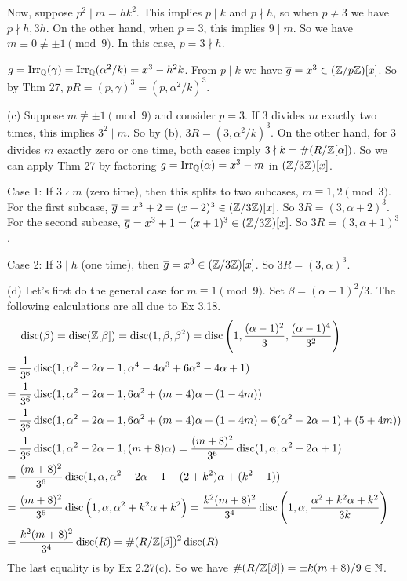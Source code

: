 \documentclass[../Marcus.tex]{subfiles}
\begin{document}
Now, suppose $p^2\mid m=hk^2$. This implies $p\mid k$ and $p\nmid h$, so when $p\neq 3$ we have $p\nmid h,3h$. On the other hand, when $p=3$, this implies $9\mid m$. So we have $m\equiv 0\not\equiv \pm 1\pmod{9}$. In this case, $p=3\nmid h$.

$g=\operatorname{Irr}_{\mathbb{Q}}(\gamma)=\operatorname{Irr}_{\mathbb{Q}}(\alpha^2/k)=x^3-h^2k$. From $p\mid k$ we have $\overline{g}=x^3\in(\mathbb{Z}/p\mathbb{Z})[x]$. So by Thm 27, $pR=(p,\gamma)^3=(p,\alpha^2/k)^3$.

(c) Suppose $m\not\equiv \pm1\pmod{9}$ and consider $p=3$. If $3$ divides $m$ exactly two times, this implies $3^2\mid m$. So by (b), $3R=(3,\alpha^2/k)^3$. On the other hand, for $3$ divides $m$ exactly zero or one time, both cases imply $3\nmid k=\#(R/\mathbb{Z}[\alpha])$. So we can apply Thm 27 by factoring $g=\operatorname{Irr}_{\mathbb{Q}}(\alpha)=x^3-m$ in $(\mathbb{Z}/3\mathbb{Z})[x]$.

Case 1: If $3\nmid m$ (zero time), then this splits to two subcases, $m\equiv 1,2\pmod{3}$. For the first subcase, $\overline{g}=x^3+2=(x+2)^3\in(\mathbb{Z}/3\mathbb{Z})[x]$. So $3R=(3,\alpha+2)^3$. For the second subcase, $\overline{g}=x^3+1=(x+1)^3\in(\mathbb{Z}/3\mathbb{Z})[x]$. So $3R=(3,\alpha+1)^3$.

Case 2: If $3\mid h$ (one time), then $\overline{g}=x^3\in(\mathbb{Z}/3\mathbb{Z})[x]$. So $3R=(3,\alpha)^3$.

(d) Let's first do the general case for $m\equiv 1 \pmod{9}$. Set $\beta=(\alpha-1)^2/3$. The following calculations are all due to Ex 3.18.
\begin{align*}
&\operatorname{disc}(\beta) = \operatorname{disc}(\mathbb{Z}[\beta]) = \operatorname{disc}(1,\beta,\beta^2) = \operatorname{disc}\left(1,\frac{(\alpha-1)^2}{3},\frac{(\alpha-1)^4}{3^2}\right) \\ ={} &\frac{1}{3^6}\operatorname{disc}(1,\alpha^2-2\alpha+1,\alpha^4-4\alpha^3+6\alpha^2-4\alpha+1) \\ ={} &\frac{1}{3^6}\operatorname{disc}(1,\alpha^2-2\alpha+1,6\alpha^2+(m-4)\alpha+(1-4m)) \\ ={} &\frac{1}{3^6}\operatorname{disc}(1,\alpha^2-2\alpha+1,6\alpha^2+(m-4)\alpha+(1-4m)-6(\alpha^2-2\alpha+1)+(5+4m)) \\ ={} &\frac{1}{3^6}\operatorname{disc}(1,\alpha^2-2\alpha+1,(m+8)\alpha) = \frac{(m+8)^2}{3^6}\operatorname{disc}(1,\alpha,\alpha^2-2\alpha+1) \\ ={} &\frac{(m+8)^2}{3^6}\operatorname{disc}(1,\alpha,\alpha^2-2\alpha+1+(2+k^2)\alpha+(k^2-1)) \\ ={} &\frac{(m+8)^2}{3^6}\operatorname{disc}\left(1,\alpha,\alpha^2+k^2\alpha+k^2\right) = \frac{k^2(m+8)^2}{3^4}\operatorname{disc}\left(1,\alpha,\frac{\alpha^2+k^2\alpha+k^2}{3k}\right) \\ ={} &\frac{k^2(m+8)^2}{3^4}\operatorname{disc}(R) = \#(R/\mathbb{Z}[\beta])^2\operatorname{disc}(R)
\end{align*}
The last equality is by Ex 2.27(c). So we have $\#(R/\mathbb{Z}[\beta])=\pm k(m+8)/9\in\mathbb{N}$.
\end{document}
